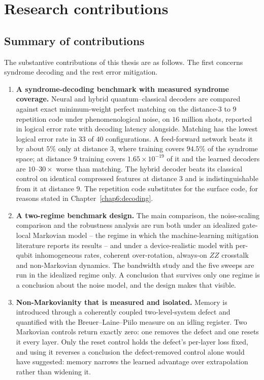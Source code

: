 \documentclass[Thesis.tex]{subfiles}
\begin{document}
\section{Research contributions}

\subsection{Summary of contributions}

The substantive contributions of this thesis are as follows. The first concerns
syndrome decoding and the rest error mitigation.

\begin{enumerate}
    \item \textbf{A syndrome-decoding benchmark with measured syndrome coverage.}
    Neural and hybrid quantum--classical decoders are compared against exact
    minimum-weight perfect matching on the distance-$3$ to $9$ repetition code under
    phenomenological noise, on $16$ million shots, reported in logical error rate
    with decoding latency alongside. Matching has the lowest logical error rate in
    $33$ of $40$ configurations. A feed-forward network beats it by about $5\%$ only
    at distance $3$, where training covers $94.5\%$ of the syndrome space; at
    distance $9$ training covers $1.65 \times 10^{-19}$ of it and the learned
    decoders are $10$--$30\times$ worse than matching. The hybrid decoder beats its
    classical control on identical compressed features at distance $3$ and is
    indistinguishable from it at distance $9$. The repetition code substitutes for
    the surface code, for reasons stated in Chapter~\ref{chap6:decoding}.

    \item \textbf{A two-regime benchmark design.} The main comparison, the
    noise-scaling comparison and the robustness analysis are run both under an
    idealized gate-local Markovian model -- the regime in which the machine-learning
    mitigation literature reports its results -- and under a device-realistic model
    with per-qubit inhomogeneous rates, coherent over-rotation, always-on $ZZ$
    crosstalk and non-Markovian dynamics. The bandwidth study and the five sweeps are
    run in the idealized regime only. A conclusion that survives only one regime is a
    conclusion about the noise model, and the design makes that visible.

    \item \textbf{Non-Markovianity that is measured and isolated.} Memory is
    introduced through a coherently coupled two-level-system defect and quantified
    with the Breuer--Laine--Piilo measure on an idling register. Two Markovian
    controls return exactly zero: one removes the defect and one resets it every
    layer. Only the reset control holds the defect's per-layer loss fixed, and using
    it reverses a conclusion the defect-removed control alone would have suggested:
    memory narrows the learned advantage over extrapolation rather than widening it.


\end{enumerate}
\end{document}
